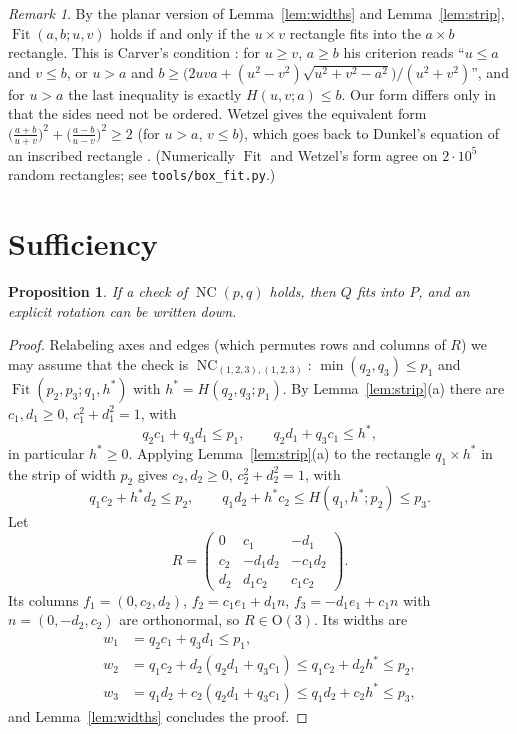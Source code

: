 \documentclass[11pt]{article}
\newtheorem{proposition}[theorem]{Proposition}
\theoremstyle{definition}
\theoremstyle{remark}
\newtheorem{remark}[theorem]{Remark}
\newcommand{\Ort}{\mathrm{O}(3)}
\newcommand{\Fit}{\operatorname{Fit}}
\newcommand{\NC}{\operatorname{NC}}
\begin{document}
\begin{remark}\label{rem:carver}
By the planar version of Lemma~\ref{lem:widths} and Lemma~\ref{lem:strip}, $\Fit(a,b;u,v)$ holds if
and only if the $u\times v$ rectangle fits into the $a\times b$ rectangle. This is Carver's condition
\cite{Carver1957}: for $u\ge v$, $a\ge b$ his criterion reads ``$u\le a$ and $v\le b$, or $u>a$ and
$b\ge\bigl(2uva+(u^2-v^2)\sqrt{u^2+v^2-a^2}\bigr)/(u^2+v^2)$'', and for $u>a$ the last inequality is
exactly $H(u,v;a)\le b$. Our form differs only in that the sides need not be ordered. Wetzel
\cite[Theorem~1]{Wetzel2000} gives the equivalent form
$\bigl(\tfrac{a+b}{u+v}\bigr)^2+\bigl(\tfrac{a-b}{u-v}\bigr)^2\ge 2$ (for $u>a$, $v\le b$), which goes back
to Dunkel's equation of an inscribed rectangle \cite{Dunkel1920}. (Numerically $\Fit$ and Wetzel's form
agree on $2\cdot10^5$ random rectangles; see \texttt{tools/box\_fit.py}.)
\end{remark}

\section{Sufficiency}\label{sec:suff}

\begin{proposition}\label{prop:suff}
If a check of $\NC(p,q)$ holds, then $Q$ fits into $P$, and an explicit rotation can be written down.
\end{proposition}

\begin{proof}
Relabeling axes and edges (which permutes rows and columns of $R$) we may assume that the check is
$\NC_{(1,2,3),(1,2,3)}$: $\min(q_2,q_3)\le p_1$ and $\Fit(p_2,p_3;q_1,h^*)$ with $h^*=H(q_2,q_3;p_1)$.
By Lemma~\ref{lem:strip}(a) there are $c_1,d_1\ge0$, $c_1^2+d_1^2=1$, with
\[
q_2c_1+q_3d_1\le p_1,\qquad q_2d_1+q_3c_1\le h^*,
\]
in particular $h^*\ge0$. Applying Lemma~\ref{lem:strip}(a) to the rectangle $q_1\times h^*$ in the
strip of width $p_2$ gives $c_2,d_2\ge 0$, $c_2^2+d_2^2=1$, with
\[
q_1c_2+h^*d_2\le p_2,\qquad q_1d_2+h^*c_2\le H(q_1,h^*;p_2)\le p_3 .
\]
Let
\[
R=\begin{pmatrix}0&c_1&-d_1\\ c_2&-d_1d_2&-c_1d_2\\ d_2&d_1c_2&c_1c_2\end{pmatrix}.
\]
Its columns $f_1=(0,c_2,d_2)$, $f_2=c_1e_1+d_1n$, $f_3=-d_1e_1+c_1n$ with $n=(0,-d_2,c_2)$ are
orthonormal, so $R\in\Ort$. Its widths are
\begin{align*}
w_1&=q_2c_1+q_3d_1\le p_1,\\
w_2&=q_1c_2+d_2(q_2d_1+q_3c_1)\le q_1c_2+d_2h^*\le p_2,\\
w_3&=q_1d_2+c_2(q_2d_1+q_3c_1)\le q_1d_2+c_2h^*\le p_3,
\end{align*}
and Lemma~\ref{lem:widths} concludes the proof.
\end{proof}
\end{document}
